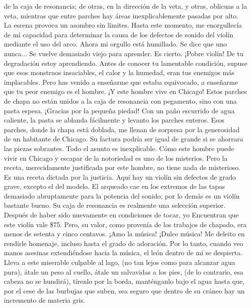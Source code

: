 de la caja de resonancia; de otras, en la dirección de la veta, y otras, oblicuas a la veta, mientras que entre parches hay áreas inexplicablemente pasadas por alto. La escena provoca un asombro sin límites. Hasta este momento, me enorgullecía de mi capacidad para determinar la causa de los defectos de sonido del violín mediante el uso del arco.
Ahora mi orgullo está humillado. Se dice que uno nunca...
Se vuelve demasiado viejo para aprender. Es cierto. ¡Pobre violín! De tu degradación estoy aprendiendo. Antes de conocer tu lamentable condición, supuse que esos monstruos insaciables, el calor y la humedad, eran tus enemigos más implacables. Pero has venido a enseñarme que estaba equivocado, a enseñarme que tu peor enemigo es el hombre. ¡Y este hombre vive en Chicago! Estos parches de chapa no están unidos a la caja de resonancia con pegamento, sino con una pasta espesa. ¡Gracias por la pequeña piedad! Con un paño escurrido de agua caliente, la pasta se ablanda fácilmente y levanto los parches enteros. Esos parches, donde la chapa está doblada, me llenan de sorpresa por la generosidad de un habitante de Chicago. Su factura podría ser igual de grande si se ahorrara las piezas sobrantes. Todo el asunto es inexplicable. Cómo este hombre puede vivir en Chicago y escapar de la notoriedad es uno de los misterios. Pero la receta, merecidamente justificada por este hombre, no tiene nada de misterioso. Es una receta dictada por la justicia. Aquí hay un violín sin defectos de grado grave, excepto el del modelo. El arqueado cae en los extremos de las tapas demasiado abruptamente para la potencia del sonido; por lo demás es un violín bastante bueno. Su caja de resonancia es realmente una selección superior. Después de haber sido nuevamente en condiciones de tocar, yo
Encuentran que este violín vale \$75. Pero, su valor, como provenía de los trabajos de chapado, era menos de setenta y cinco centavos. ¡Amo la música! ¡Dulce música! Me deleito en rendirle homenaje, incluso hasta el grado de adoración. Por lo tanto, cuando veo manos asesinas extendiéndose hacia la música, el león dentro de mí se despierta. Lleva a este miserable culpable al lago, (no tan lejos como para alcanzar agua pura), átale un peso al cuello, átale un salvavidas a los pies,
(de lo contrario, esa cabeza no se hundirá), tírenlo por la borda, manténganlo bajo el agua hasta que, por el cese de las burbujas que suben, sea seguro que dentro de su cráneo hay un incremento de materia gris.
